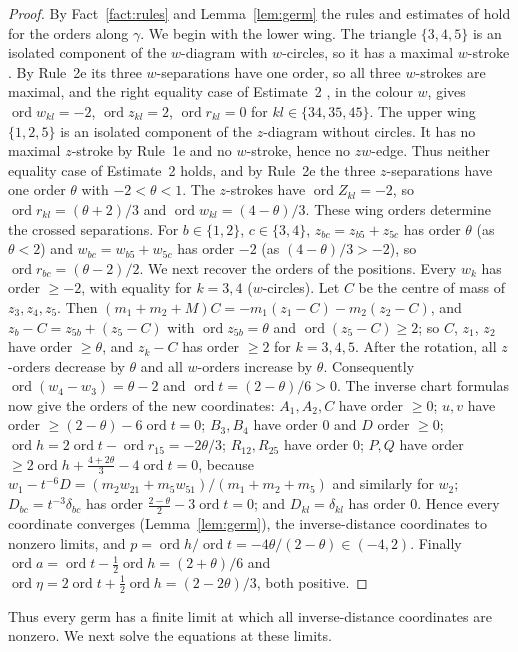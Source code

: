 \documentclass[Threeside,11pt]{article}
\theoremstyle{definition}
\theoremstyle{remark}
\numberwithin{equation}{section}
\theoremstyle{remark}
\newcommand{\ord}{\operatorname{ord}}
\begin{document}
\begin{proof}
By Fact~\ref{fact:rules} and Lemma~\ref{lem:germ} the rules and estimates of \cite[\S3]{AK}
hold for the orders along $\gamma$.
We begin with the lower wing.  The triangle $\{3,4,5\}$ is an isolated component of
the $w$-diagram with $w$-circles, so it has a maximal $w$-stroke
\cite[Rule~1e, p.~546]{AK}.  By Rule~2e its three
$w$-separations have one order, so all three $w$-strokes are maximal, and the right equality
case of Estimate~2 \cite[p.~548]{AK}, in the colour $w$, gives $\ord w_{kl}=-2$,
$\ord z_{kl}=2$, $\ord r_{kl}=0$ for $kl\in\{34,35,45\}$.
The upper wing $\{1,2,5\}$ is an isolated component of the $z$-diagram without
circles.  It has no maximal $z$-stroke by Rule~1e and no $w$-stroke, hence no $zw$-edge.
Thus
neither equality case of Estimate~2 holds, and by Rule~2e the three $z$-separations have one
order $\theta$ with $-2<\theta<1$.  The $z$-strokes have $\ord Z_{kl}=-2$, so
$\ord r_{kl}=(\theta+2)/3$ and $\ord w_{kl}=(4-\theta)/3$.
These wing orders determine the crossed separations.  For $b\in\{1,2\}$, $c\in\{3,4\}$, $z_{bc}=z_{b5}+z_{5c}$ has order
$\theta$ (as $\theta<2$) and $w_{bc}=w_{b5}+w_{5c}$ has order $-2$ (as $(4-\theta)/3>-2$), so
$\ord r_{bc}=(\theta-2)/2$.
We next recover the orders of the positions.  Every $w_k$ has order $\ge-2$, with equality for $k=3,4$ ($w$-circles).  Let
$C$ be the centre of mass of $z_3,z_4,z_5$.  Then $(m_1+m_2+M)C=-m_1(z_1-C)-m_2(z_2-C)$, and
$z_b-C=z_{5b}+(z_5-C)$ with $\ord z_{5b}=\theta$ and $\ord(z_5-C)\ge2$; so $C$, $z_1$, $z_2$
have order $\ge\theta$, and $z_k-C$ has order $\ge2$ for $k=3,4,5$.
After the rotation, all $z$-orders decrease by $\theta$ and all $w$-orders increase
by $\theta$.  Consequently $\ord(w_4-w_3)=\theta-2$ and
$\ord t=(2-\theta)/6>0$.  The inverse chart formulas now give the orders of the new
coordinates: $A_1,A_2,C$ have order $\ge0$; $u,v$ have order $\ge(2-\theta)-6\ord t=0$; $B_3,B_4$
have order $0$ and $D$ order $\ge0$; $\ord h=2\ord t-\ord r_{15}=-2\theta/3$; $R_{12},R_{25}$
have order $0$; $P,Q$ have order $\ge2\ord h+\frac{4+2\theta}3-4\ord t=0$, because
$w_1-t^{-6}D=(m_2w_{21}+m_5w_{51})/(m_1+m_2+m_5)$ and similarly for $w_2$; $D_{bc}=t^{-3}\delta_{bc}$
has order $\frac{2-\theta}2-3\ord t=0$; and $D_{kl}=\delta_{kl}$ has order $0$.  Hence every
coordinate converges (Lemma~\ref{lem:germ}), the inverse-distance coordinates to nonzero limits,
and $p=\ord h/\ord t=-4\theta/(2-\theta)\in(-4,2)$.  Finally
$\ord a=\ord t-\frac12\ord h=(2+\theta)/6$ and $\ord\eta=2\ord t+\frac12\ord h=(2-2\theta)/3$,
both positive.
\end{proof}
Thus every germ has a finite limit at which all inverse-distance coordinates
are nonzero.  We next solve the equations at these limits.
\end{document}
